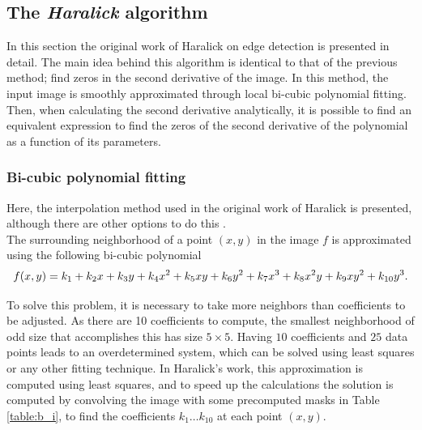 \documentclass{ipol}
\numberwithin{equation}{section}
\numberwithin{table}{section}
\numberwithin{figure}{section}
\begin{document}
\subsection{The \textit{Haralick} algorithm}

In this section the original work of Haralick \cite{bb20239} on edge detection is presented in detail.
The main idea behind this algorithm is identical to that of the previous method; find zeros in 
the second derivative of the image. In this method, the input image is smoothly approximated through local bi-cubic
polynomial fitting. Then, when calculating the second derivative analytically, it is possible to find 
an equivalent expression to find the zeros of the second derivative of the polynomial as a function of 
its parameters.%


\subsubsection{Bi-cubic polynomial fitting}
\label{sec:bicubic}

Here, the interpolation method used in the original work of Haralick is presented, although there are other options to do this \cite{getreuer}. \\

The surrounding neighborhood of a point $(x,y)$ in the image $f$ is approximated using the following bi-cubic polynomial
\begin{equation}
	\label{eq:bicubic}
	f(x,y) = k_1 + k_2x + k_3y + k_4x^2 + k_5xy + k_6y^2 + k_7x^3 + k_8x^2y + k_9xy^2 + k_{10}y^3. \\
\end{equation}

To solve this problem, it is necessary to take more neighbors than coefficients to be adjusted. As there are 10 coefficients to compute, the smallest 
neighborhood of odd size that accomplishes this has size $5\times5$. Having $10$ coefficients and $25$ data 
points leads to an overdetermined system, which can be solved using least squares or any other fitting technique.
In Haralick's work, this approximation is computed using least squares, and to speed up the calculations the solution is 
computed by convolving the image with some precomputed masks in Table \ref{table:b_i}, to find the coefficients $k_1\dots k_{10}$ at each point $(x,y)$. \\
\end{document}
